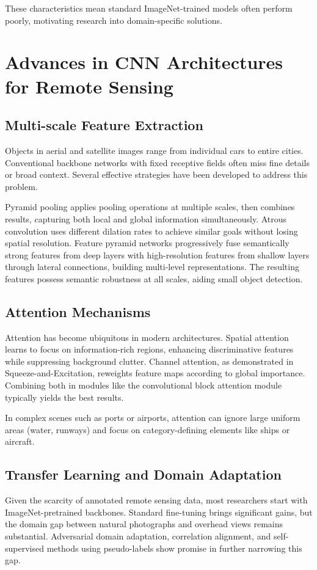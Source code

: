 \documentclass[12pt,a4paper]{article}
\begin{document}
These characteristics mean standard ImageNet-trained models often perform poorly, motivating research into domain-specific solutions.

\section{Advances in CNN Architectures for Remote Sensing}
\label{sec:developments}
\subsection{Multi-scale Feature Extraction}
Objects in aerial and satellite images range from individual cars to entire cities. Conventional backbone networks with fixed receptive fields often miss fine details or broad context. Several effective strategies have been developed to address this problem.

Pyramid pooling applies pooling operations at multiple scales, then combines results, capturing both local and global information simultaneously. Atrous convolution uses different dilation rates to achieve similar goals without losing spatial resolution. Feature pyramid networks progressively fuse semantically strong features from deep layers with high-resolution features from shallow layers through lateral connections, building multi-level representations. The resulting features possess semantic robustness at all scales, aiding small object detection.

\subsection{Attention Mechanisms}
Attention has become ubiquitous in modern architectures. Spatial attention learns to focus on information-rich regions, enhancing discriminative features while suppressing background clutter. Channel attention, as demonstrated in Squeeze-and-Excitation, reweights feature maps according to global importance. Combining both in modules like the convolutional block attention module typically yields the best results.

In complex scenes such as ports or airports, attention can ignore large uniform areas (water, runways) and focus on category-defining elements like ships or aircraft.

\subsection{Transfer Learning and Domain Adaptation}
Given the scarcity of annotated remote sensing data, most researchers start with ImageNet-pretrained backbones. Standard fine-tuning brings significant gains, but the domain gap between natural photographs and overhead views remains substantial. Adversarial domain adaptation, correlation alignment, and self-supervised methods using pseudo-labels show promise in further narrowing this gap.
\end{document}
